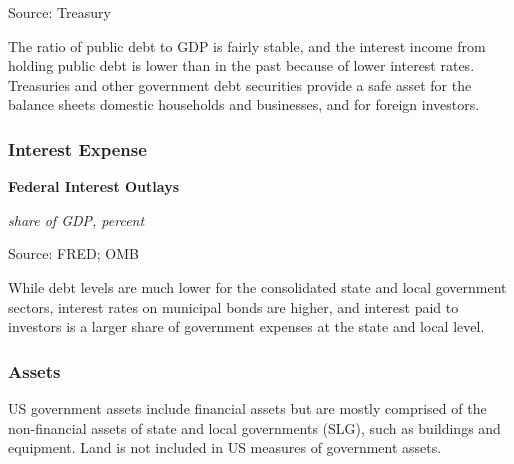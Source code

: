 \documentclass{report}
\makeatletter
\newcommand{\tbllink}[1]{\href{https://raw.githubusercontent.com/bdecon/US-chartbook/master/chartbook/data/#1}{\faTable}}
\newcommand*\short[1]{\expandafter\@gobbletwo\number\numexpr#1\relax}
\newcommand{\shdateaxisticks}{
		date coordinates in=x, axis line style={draw=none},
		xmax={2021-01-01},
		max space between ticks=40,	    
		xtick={{1990-01-01}, {1995-01-01}, {2000-01-01}, 
			{2005-01-01}, {2010-01-01}, {2015-01-01}, {2020-01-01}},
		minor xtick={},
		enlarge y limits={0.06}, enlarge x limits={0.01},
		}
\newcommand{\thickline}[4]{\addplot[ultra thick, no markers, color=#1] 
		table [x=#2, y=#3, col sep=comma] {#4};	}
\newcommand{\rbars}{
		\fill[color=black!10] (axis cs:{1990-07-01},\pgfkeysvalueof{/pgfplots/ymin}) rectangle 
			(axis cs:{1991-03-01}, \pgfkeysvalueof{/pgfplots/ymax});
		\fill[color=black!10] (axis cs:{2007-12-01},\pgfkeysvalueof{/pgfplots/ymin}) rectangle 
			(axis cs:{2009-07-01}, \pgfkeysvalueof{/pgfplots/ymax});
		\fill[color=black!10] (axis cs:{2001-03-01},\pgfkeysvalueof{/pgfplots/ymin}) rectangle 
			(axis cs:{2001-11-01}, \pgfkeysvalueof{/pgfplots/ymax});
		\fill[color=black!10] (axis cs:{2020-02-01},\pgfkeysvalueof{/pgfplots/ymin}) rectangle 
			(axis cs:{2020-09-01}, \pgfkeysvalueof{/pgfplots/ymax});}
\makeatother
\begin{document}
{{{{{\begin{minipage}{0.76\textwidth}
\footnotesize{Source: Treasury} \hfill \tbllink{pubdebt.csv}

\vspace{4mm}

\small The ratio of public debt to GDP is fairly stable, and the interest income from holding public debt is lower than in the past because of lower interest rates. Treasuries and other government debt securities provide a safe asset for the balance sheets domestic households and businesses, and for foreign investors.

\end{minipage}

\subsubsection*{\color{black!70} \seriffont Interest Expense}

\begin{minipage}{0.33\textwidth}
\small 
\end{minipage} \hspace{7mm} \begin{minipage}{0.37\textwidth}
\normalsize \textbf{Federal Interest Outlays}

\footnotesize{\textit{share of GDP, percent}}

\hspace*{-2mm} 

\footnotesize{Source: FRED; OMB} \hfill \tbllink{fedintexp.csv}

\end{minipage} 

\vspace{2mm}

\begin{minipage}{0.76\textwidth}
\small While debt levels are much lower for the consolidated state and local government sectors, interest rates on municipal bonds are higher, and interest paid to investors is a larger share of government expenses at the state and local level.
\end{minipage}
\newpage
\subsubsection*{\color{black!70} \seriffont Assets}
\begin{minipage}{0.76\textwidth}
\small US government assets include financial assets but are mostly comprised of the non-financial assets of state and local governments (SLG), such as buildings and equipment. Land is not included in US measures of government assets. \\


\end{minipage}}}}}}
\end{document}
